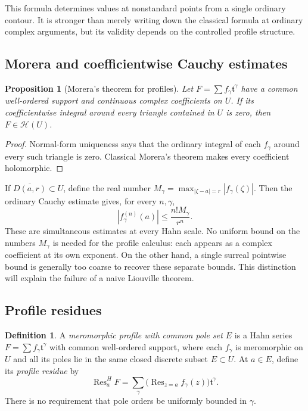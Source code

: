 \documentclass[11pt,a4paper]{article}
\numberwithin{equation}{section}
\newtheorem{proposition}[theorem]{Proposition}
\theoremstyle{definition}
\newtheorem{definition}[theorem]{Definition}
\newcommand{\tmon}{\mathfrak t}
\newcommand{\HH}{\mathscr H}
\newcommand{\Res}{\operatorname{Res}}
\begin{document}
This formula determines values at nonstandard points from a single ordinary
contour. It is stronger than merely writing down the classical formula at
ordinary complex arguments, but its validity depends on the controlled
profile structure.

\subsection{Morera and coefficientwise Cauchy estimates}

\begin{proposition}[Morera's theorem for profiles]
Let $F=\sum f_\gamma\tmon^\gamma$ have a common well-ordered support and
continuous complex coefficients on $U$. If its coefficientwise integral
around every triangle contained in $U$ is zero, then $F\in\HH(U)$.
\end{proposition}
\begin{proof}
Normal-form uniqueness says that the ordinary integral of each $f_\gamma$
around every such triangle is zero. Classical Morera's theorem makes every
coefficient holomorphic.
\end{proof}

If $\overline{D(a,r)}\subset U$, define the real number
$M_\gamma=\max_{|\zeta-a|=r}|f_\gamma(\zeta)|$. Then the ordinary Cauchy
estimate gives, for every $n,\gamma$,
\begin{equation}\label{eq:cauchyest}
 |f_\gamma^{(n)}(a)|\leq \frac{n!M_\gamma}{r^n}.
\end{equation}
These are simultaneous estimates at every Hahn scale. No uniform bound on
the numbers $M_\gamma$ is needed for the profile calculus: each appears as a
complex coefficient at its own exponent. On the other hand, a single
surreal pointwise bound is generally too coarse to recover these separate
bounds. This distinction will explain the failure of a naive Liouville theorem.

\subsection{Profile residues}

\begin{definition}
A \emph{meromorphic profile with common pole set $E$} is a Hahn series
$F=\sum f_\gamma\tmon^\gamma$ with common well-ordered support, where each
$f_\gamma$ is meromorphic on $U$ and all its poles lie in the same closed
discrete subset $E\subset U$. At $a\in E$, define its \emph{profile residue}
by
\[
 \Res^H_a F=\sum_\gamma
       \bigl(\Res_{z=a}f_\gamma(z)\bigr)\tmon^\gamma.
\]
There is no requirement that pole orders be uniformly bounded in $\gamma$.
\end{definition}
\end{document}
